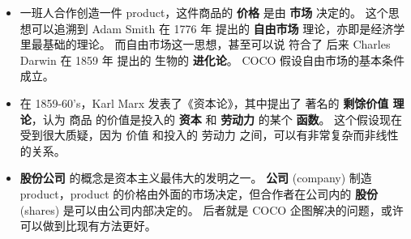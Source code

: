 \documentclass[12pt, orivec, fleqn]{article}
\newcommand{\cc}[2]{#1}
\newcommand{\cc}[2]{#2}
\begin{document}
\begin{itemize}

\item \cc{
	一班人合作创造一件 product，这件商品的 \textbf{价格} 是由 \textbf{市场} 决定的。  这个思想可以追溯到 Adam Smith 在 1776 年 提出的 \textbf{自由市场} 理论，亦即是经济学里最基础的理论。 而自由市场这一思想，甚至可以说 符合了 后来 Charles Darwin 在 1859 年 提出的 生物的 \textbf{进化论}。  COCO 假设自由市场的基本条件成立。
}{
	When a group of people creates a \textbf{product}, its \textbf{price} is determined by the \textbf{market}.  This idea, first articulated by Adam Smith in 1776, is one of the foundational principles of all economics.  It can be said that free-market competition is also congruent with the idea of biological \textbf{evolution}, posited by Charles Darwin, later in 1859.  We assume here that the conditions of free-market economics are satisfied.
}

\item \cc{
	在 1859-60's，Karl Marx 发表了《资本论》，其中提出了 著名的 \textbf{剩馀价值 理论}，认为 商品 的价值是投入的 \textbf{资本} 和 \textbf{劳动力} 的某个 \textbf{函数}。  这个假设现在受到很大质疑，因为 价值 和投入的 劳动力 之间，可以有非常复杂而非线性的关系。 
}{
	Around 1859-60's, Karl Marx published \textit{Das Kapital}, in which he posited the now-famous theory of \textbf{surplus values}.  According to this view, the value of a commodity is construed as a function of the input of \textbf{capital} and \textbf{labor}.  Currently, this assumption is thrown into great doubt because the value of a product may depend on input labor in highly complex and non-linear relations.
}

\item \cc{
	\textbf{股份公司} 的概念是资本主义最伟大的发明之一。  \textbf{公司} (company) 制造 product，product 的价格由外面的市场决定，但合作者在公司内的 \textbf{股份} (shares) 是可以由公司内部决定的。  后者就是 COCO 企图解决的问题，或许可以做到比现有方法更好。
}{
	Economists would agree that the notion of \textbf{joint-stock companies} is one of the greatest inventions of capitalism.  While prices are determined externally by markets, the shares of a company that a participant owns can be decided internally by the company.  The goal of COCO is to provide a (hopefully) better method of distributing shares for online companies.
}
\end{itemize}


\printbibliography
\end{document}
